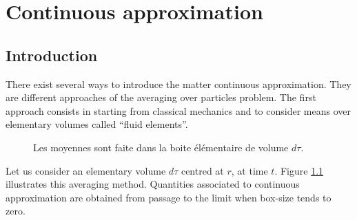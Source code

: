 \documentclass[12pt]{book}
\begin{document}
\chapter{Continuous approximation}\label{chapapproxconti}
\section{Introduction}
There exist several ways to introduce the matter continuous
approximation. They are different approaches of the averaging over particles
problem. The first approach consists in starting from classical mechanics and
to consider means over elementary volumes called ``fluid elements''.
\begin{figure}[htb]
 \centerline{}   
 \caption{Les moyennes sont faite dans la boite \'el\'ementaire de
volume $d\tau$.}
 \label{figvolele}
\end{figure}
Let us consider an elementary volume $d\tau$ centred at $r$, at time
$t$. Figure \ref{figvolele} illustrates this averaging method. Quantities
associated to continuous approximation are obtained from passage to the limit
when box-size tends to zero.
\end{document}
